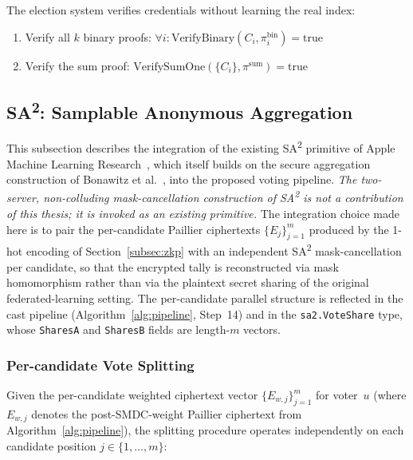 The election system verifies credentials without learning the real index:
\begin{enumerate}
    \item Verify all $k$ binary proofs: $\forall i: \text{VerifyBinary}(C_i, \pi_i^{\text{bin}}) = \text{true}$
    \item Verify the sum proof: $\text{VerifySumOne}(\{C_i\}, \pi^{\text{sum}}) = \text{true}$
\end{enumerate}

\subsection{SA\textsuperscript{2}: Samplable Anonymous Aggregation}
\label{subsec:sa2}

This subsection describes the integration of the existing SA\textsuperscript{2} primitive of Apple Machine Learning Research~\cite{sa2_apple}, which itself builds on the secure aggregation construction of Bonawitz et al.~\cite{bonawitz2017}, into the proposed voting pipeline. \emph{The two-server, non-colluding mask-cancellation construction of SA\textsuperscript{2} is not a contribution of this thesis; it is invoked as an existing primitive.} The integration choice made here is to pair the per-candidate Paillier ciphertexts $\{E_j\}_{j=1}^{m}$ produced by the 1-hot encoding of Section~\ref{subsec:zkp} with an independent SA\textsuperscript{2} mask-cancellation per candidate, so that the encrypted tally is reconstructed via mask homomorphism rather than via the plaintext secret sharing of the original federated-learning setting. The per-candidate parallel structure is reflected in the cast pipeline (Algorithm~\ref{alg:pipeline}, Step~14) and in the \texttt{sa2.VoteShare} type, whose \texttt{SharesA} and \texttt{SharesB} fields are length-$m$ vectors.

\subsubsection{Per-candidate Vote Splitting}
\label{subsubsec:sa2-split}

Given the per-candidate weighted ciphertext vector $\{E_{w,j}\}_{j=1}^{m}$ for voter~$u$ (where $E_{w,j}$ denotes the post-SMDC-weight Paillier ciphertext from Algorithm~\ref{alg:pipeline}), the splitting procedure operates independently on each candidate position $j \in \{1, \ldots, m\}$:

